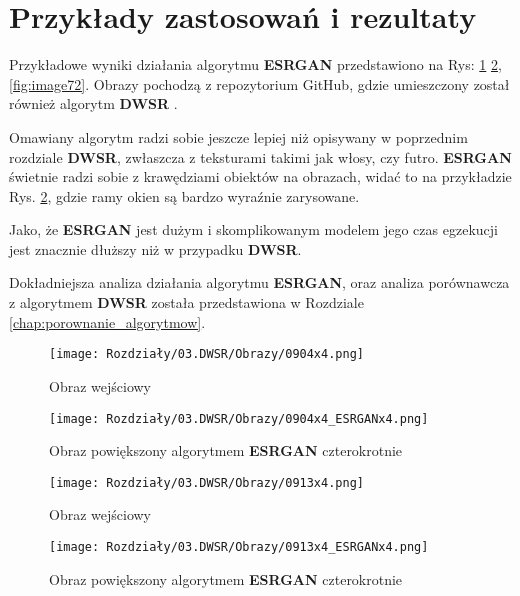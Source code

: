 \section{Przykłady zastosowań i rezultaty}

Przykładowe wyniki działania algorytmu \textbf{ESRGAN} przedstawiono na Rys: \ref{fig:image68} \ref{fig:image70}, \ref{fig:image72}. Obrazy pochodzą z repozytorium GitHub, gdzie umieszczony został również algorytm \textbf{DWSR} \cite{guo2017deep}.

Omawiany algorytm radzi sobie jeszcze lepiej niż opisywany w poprzednim rozdziale \textbf{DWSR}, zwłaszcza z teksturami takimi jak włosy, czy futro. \textbf{ESRGAN} świetnie radzi sobie z krawędziami obiektów na obrazach, widać to na przykładzie Rys. \ref{fig:image70}, gdzie ramy okien są bardzo wyraźnie zarysowane.

Jako, że \textbf{ESRGAN} jest dużym i skomplikowanym modelem jego czas egzekucji jest znacznie dłuższy niż w przypadku \textbf{DWSR}. 

Dokładniejsza analiza działania algorytmu \textbf{ESRGAN}, oraz analiza porównawcza z algorytmem \textbf{DWSR} została przedstawiona w Rozdziale \ref{chap:porownanie_algorytmow}.


\begin{figure}[ht]
    \centering
    \begin{minipage}[t]{0.45\linewidth}
        \texttt{[image: Rozdziały/03.DWSR/Obrazy/0904x4.png]}
        \caption{Obraz wejściowy}
        \label{fig:image67}
    \end{minipage}
    \hspace{0.5cm}
    \begin{minipage}[t]{0.45\linewidth}
        \texttt{[image: Rozdziały/03.DWSR/Obrazy/0904x4\_ESRGANx4.png]}
        \caption{Obraz powiększony algorytmem \textbf{ESRGAN} czterokrotnie}
        \label{fig:image68}
    \end{minipage}
\end{figure}

\begin{figure}[ht]
    \centering
    \begin{minipage}[t]{0.45\linewidth}
        \texttt{[image: Rozdziały/03.DWSR/Obrazy/0913x4.png]}
        \caption{Obraz wejściowy}
        \label{fig:image69}
    \end{minipage}
    \hspace{0.5cm}
    \begin{minipage}[t]{0.45\linewidth}
        \texttt{[image: Rozdziały/03.DWSR/Obrazy/0913x4\_ESRGANx4.png]}
        \caption{Obraz powiększony algorytmem \textbf{ESRGAN} czterokrotnie}
        \label{fig:image70}
    \end{minipage}
\end{figure}

